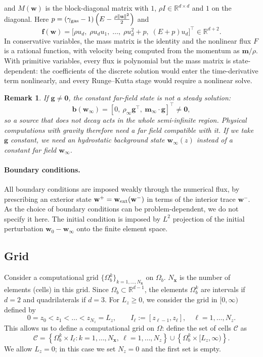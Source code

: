 \documentclass[11pt]{article}
\newcommand{\Rbb}{\mathbb{R}}
\newcommand{\bw}{\mathbf{w}}
\newcommand{\bx}{\mathbf{x}}
\newcommand{\bb}{\mathbf{b}}
\newcommand{\bff}{\mathbf{f}}
\newcommand{\bu}{\mathbf{u}}
\newcommand{\mom}{\mathbf{m}}
\newcommand{\bg}{\mathbf{g}}
\newtheorem{remark}[theorem]{Remark}
\begin{document}
	and $M(\bw)$ is the block-diagonal matrix with $1$, $\rho I\in\Rbb^{d\times d}$ and $1$ on the diagonal. Here $p=(\gamma_{\rm gas}-1)\left(E-\frac{\rho\lVert\bu\rVert^2}{2}\right)$ and
	\[
	\bff(\bw)=\big[\rho u_d,\;\rho u_du_1,\;\dots,\;\rho u_d^2+p,\;(E+p)u_d\big]^\top\in\Rbb^{d+2}.
	\]
	In conservative variables, the mass matrix is the identity and the nonlinear flux $F$ is a rational function, with velocity being computed from the momentum as $\mom/\rho$. With primitive variables, every flux is polynomial but the mass matrix is state-dependent: the coefficients of the discrete solution would enter the time-derivative term nonlinearly, and every Runge--Kutta stage would require a nonlinear solve.
	
	\begin{remark}
		If $\bg\neq\mathbf{0}$, the constant far-field state is not a steady solution:
		\[
		\bb(\bw_\infty)=[0,\ \rho_\infty\bg^\top,\ \mom_\infty\cdot\bg]^\top\neq\mathbf{0},
		\]
		so a source that does not decay acts in the whole semi-infinite region. Physical computations with gravity therefore need a far field compatible with it. If we take $\bg$ constant, we need an hydrostatic background state $\bw_\infty(z)$ instead of a constant far field $\bw_\infty$.
	\end{remark} 
	
	\paragraph{Boundary conditions.} All boundary conditions are imposed weakly through the numerical flux, by prescribing an exterior state $\bw^+=\bw_{\rm ext}(\bw^-)$ in terms of the interior trace $\bw^-$. As the choice of boundary conditions can be problem-dependent, we do not specify it here. The initial condition is imposed by $L^2$ projection of the initial perturbation $\bw_0-\bw_\infty$ onto the finite element space.
	
	
	\subsection*{Grid}
	
	Consider a computational grid $\{\Omega_b^k\}_{k=1,\dots,N_\bx}$ on $\Omega_b$. $N_\bx$ is the number of elements (cells) in this grid. Since $\Omega_b\subset\Rbb^{d-1}$, the elements $\Omega_b^k$ are intervals if $d=2$ and quadrilaterals if $d=3$. For $L_z\ge0$, we consider the grid in $[0,\infty)$ defined by
	\[
	0=z_0<z_1<\dots<z_{N_z}=L_z, \qquad I_\ell:=[z_{\ell-1},z_\ell],\quad \ell=1,\dots,N_z.
	\]
	This allows us to define a computational grid on $\Omega$: define the set of cells $\mathcal{C}$ as
	\[
	\mathcal{C}=\left\{\Omega_b^k\times I_\ell: k=1,\dots,N_\bx,\ \ell=1,\dots,N_z\right\}\cup\left\{\Omega_b^k\times[L_z,\infty)\right\}.
	\]
	We allow $L_z=0$; in this case we set $N_z=0$ and the first set is empty.
	
\end{document}
